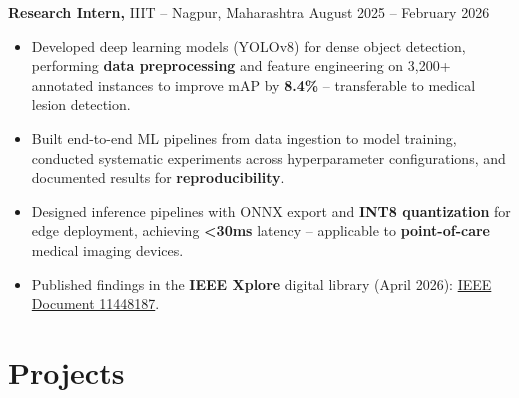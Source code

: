 \documentclass[10pt]{article}        %
\begin{document}
\textbf{Research Intern,} {IIIT} -- Nagpur, Maharashtra \hfill August 2025 -- February 2026 \\
\vspace{-9pt}
\begin{itemize}
  \item Developed deep learning models (YOLOv8) for dense object detection, performing \textbf{\textcolor{NavyBlue}{data preprocessing}} and feature engineering on 3,200+ annotated instances to improve mAP by \textbf{\textcolor{NavyBlue}{8.4\%}} -- transferable to medical lesion detection.
  \item Built end-to-end ML pipelines from data ingestion to model training, conducted systematic experiments across hyperparameter configurations, and documented results for \textbf{\textcolor{NavyBlue}{reproducibility}}.
  \item Designed inference pipelines with ONNX export and \textbf{\textcolor{NavyBlue}{INT8 quantization}} for edge deployment, achieving \textbf{\textcolor{NavyBlue}{<30ms}} latency -- applicable to \textbf{\textcolor{NavyBlue}{point-of-care}} medical imaging devices.
  \item Published findings in the \textbf{\textcolor{NavyBlue}{IEEE Xplore}} digital library (April 2026): \href{https://ieeexplore.ieee.org/document/11448187/}{IEEE Document 11448187}.
\end{itemize}

\vspace{-19pt}

\section*{Projects}
\end{document}
